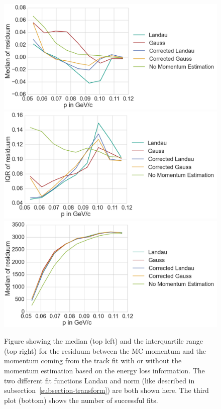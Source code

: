 \begin{figure}
  \centering
  \includegraphics[width=0.48\linewidth]{figures/vxd/kalman0_3Median.png}
  \includegraphics[width=0.48\linewidth]{figures/vxd/kalman0_3IQR.png}
  \includegraphics[width=0.48\linewidth]{figures/vxd/kalman0_3Count.png}
  \caption[Residuum of the momentum estimation for different fit functions.]{Figure showing the median (top left) and the interquartile range (top right) for the residuum between the MC momentum and the momentum coming from the track fit with or without the momentum estimation based on the energy loss information. The two different fit functions Landau and norm (like described in subsection~\ref{subsection-transform}) are both shown here. The third plot (bottom) shows the number of successful fits.}
  \label{fig-results-fit}
\end{figure}


